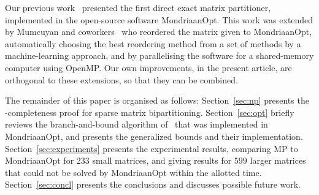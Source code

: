 Our previous work~\cite{pelt15} presented the first direct
exact matrix partitioner, implemented in the open-source software
MondriaanOpt. This work was extended by Mumcuyan
and coworkers~\cite{mumcuyan18} who 
reordered the matrix given to MondriaanOpt,
automatically choosing the best reordering method
from a set of methods by a machine-learning approach,
and by parallelising the software for a shared-memory computer
using OpenMP. 
Our own improvements, in the present article,
are orthogonal to these extensions,
so that they can be combined.  

The remainder of this paper is organised as follows:
Section~\ref{sec:np} presents the \NP-completeness proof 
for sparse matrix bipartitioning.
Section~\ref{sec:opt} briefly reviews the
branch-and-bound algorithm of~\cite{pelt15}
that was implemented in MondriaanOpt, and presents the generalized bounds
and their implementation.
Section~\ref{sec:experiments} presents the experimental results,
comparing MP to MondriaanOpt for 233 small matrices, 
and giving results for 599 larger matrices that could not be solved
by MondriaanOpt within the allotted time.
Section~\ref{sec:concl} presents the conclusions and discusses possible future
work.

